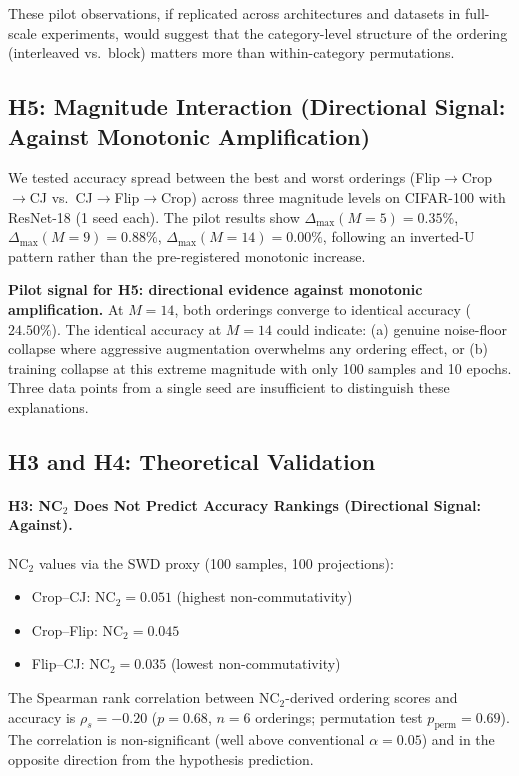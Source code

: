 \documentclass{article}
\begin{document}
These pilot observations, if replicated across architectures and datasets in full-scale experiments, would suggest that the category-level structure of the ordering (interleaved vs.\ block) matters more than within-category permutations.

\subsection{H5: Magnitude Interaction (Directional Signal: Against Monotonic Amplification)}

We tested accuracy spread between the best and worst orderings (Flip$\to$Crop$\to$CJ vs.\ CJ$\to$Flip$\to$Crop) across three magnitude levels on CIFAR-100 with ResNet-18 (1 seed each). The pilot results show $\Delta_{\max}(M\!=\!5) = 0.35\%$, $\Delta_{\max}(M\!=\!9) = 0.88\%$, $\Delta_{\max}(M\!=\!14) = 0.00\%$, following an inverted-U pattern rather than the pre-registered monotonic increase.

\textbf{Pilot signal for H5: directional evidence against monotonic amplification.} At $M=14$, both orderings converge to identical accuracy ($24.50\%$). The identical accuracy at $M=14$ could indicate: (a) genuine noise-floor collapse where aggressive augmentation overwhelms any ordering effect, or (b) training collapse at this extreme magnitude with only 100 samples and 10 epochs. Three data points from a single seed are insufficient to distinguish these explanations.

\subsection{H3 and H4: Theoretical Validation}

\paragraph{H3: NC$_2$ Does Not Predict Accuracy Rankings (Directional Signal: Against).}

NC$_2$ values via the SWD proxy (100 samples, 100 projections):
\begin{itemize}
\item Crop--CJ: NC$_2 = 0.051$ (highest non-commutativity)
\item Crop--Flip: NC$_2 = 0.045$
\item Flip--CJ: NC$_2 = 0.035$ (lowest non-commutativity)
\end{itemize}

The Spearman rank correlation between NC$_2$-derived ordering scores and accuracy is $\rho_s = -0.20$ ($p = 0.68$, $n=6$ orderings; permutation test $p_{\mathrm{perm}} = 0.69$). The correlation is non-significant (well above conventional $\alpha = 0.05$) and in the opposite direction from the hypothesis prediction.
\end{document}

